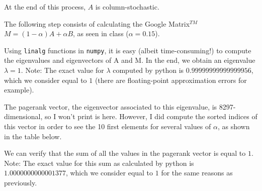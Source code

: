 \documentclass[]{article}
\begin{document}
At the end of this process, $A$ is column-stochastic.

The following step consists of calculating the Google Matrix$^{TM}$ $M = (1-\alpha)A + \alpha B$, as seen in class ($\alpha = 0.15$).

Using \texttt{linalg} functions in \texttt{numpy}, it is easy (albeit time-consuming!) to compute the eigenvalues and eigenvectors of A and M. In the end, we obtain an eigenvalue $\lambda = 1$.  Note: The exact value for $\lambda$ computed by python is $0.99999999999999956$, which we consider equal to $1$ (there are floating-point approximation errors for example).

The pagerank vector, the eigenvector associated to this eigenvalue, is 8297-dimensional, so I won't print is here. However, I did compute the sorted indices of this vector in order to see the 10 first elements for several values of $\alpha$, as shown in the table below.

We can verify that the sum of all the values in the pagerank vector is equal to $1$. Note: The exact value for this sum as calculated by python is $1.0000000000001377$, which we consider equal to $1$ for the same reasons as previously.

\begin{center}
\end{center}
\end{document}
